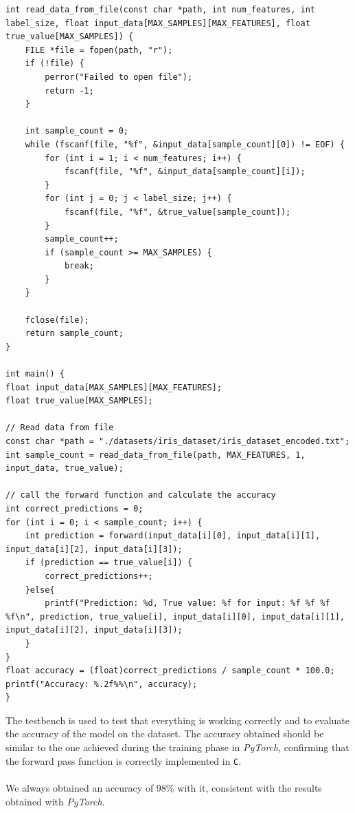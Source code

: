 \documentclass{article}
\begin{document}
\begin{lstlisting}
int read_data_from_file(const char *path, int num_features, int label_size, float input_data[MAX_SAMPLES][MAX_FEATURES], float true_value[MAX_SAMPLES]) {
    FILE *file = fopen(path, "r");
    if (!file) {
        perror("Failed to open file");
        return -1;
    }

    int sample_count = 0;
    while (fscanf(file, "%f", &input_data[sample_count][0]) != EOF) {
        for (int i = 1; i < num_features; i++) {
            fscanf(file, "%f", &input_data[sample_count][i]);
        }
        for (int j = 0; j < label_size; j++) {
            fscanf(file, "%f", &true_value[sample_count]);
        }
        sample_count++;
        if (sample_count >= MAX_SAMPLES) {
            break;
        }
    }

    fclose(file);
    return sample_count;
}

int main() {
float input_data[MAX_SAMPLES][MAX_FEATURES];
float true_value[MAX_SAMPLES];

// Read data from file
const char *path = "./datasets/iris_dataset/iris_dataset_encoded.txt";
int sample_count = read_data_from_file(path, MAX_FEATURES, 1, input_data, true_value);

// call the forward function and calculate the accuracy
int correct_predictions = 0;
for (int i = 0; i < sample_count; i++) {
    int prediction = forward(input_data[i][0], input_data[i][1], input_data[i][2], input_data[i][3]);
    if (prediction == true_value[i]) {
        correct_predictions++;
    }else{
        printf("Prediction: %d, True value: %f for input: %f %f %f %f\n", prediction, true_value[i], input_data[i][0], input_data[i][1], input_data[i][2], input_data[i][3]);
    }
}
float accuracy = (float)correct_predictions / sample_count * 100.0;
printf("Accuracy: %.2f%%\n", accuracy);
}
\end{lstlisting}

The testbench is used to test that everything is working correctly and to evaluate the accuracy of the model on the dataset. The accuracy obtained should be similar to the one achieved during the training phase in \textit{PyTorch}, confirming that the forward pass function is correctly implemented in \texttt{C}.
\\\\We always obtained an accuracy of 98\% with it, consistent with the results obtained with \textit{PyTorch}.
\end{document}
